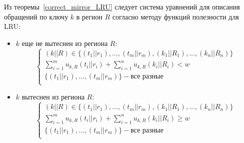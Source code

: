 \documentclass[14pt]{extreport}
\newcommand{\LRU}{\textsf{LRU}\xspace}
\begin{document}
Из теоремы~\ref{correct_mirror_LRU} следует система уравнений для
описания обращений по ключу $k$ в регион $R$ согласно методу функций полезности
для \LRU: \begin{itemize}
\item $k$ еще не вытеснен из региона $R$:
$$
\left\{\begin{array}{l} (k||R) \in \{(t_1||r_1), ..., (t_m||r_m), (k_1||R_1),
..., (k_n||R_n)\}\\
\sum\limits_{i=1}^m u_{k,R}(t_i||r_i) + \sum\limits_{i=1}^n u_{k,R}(k_i||R_i) <
w\\
\{(t_1||r_1), ..., (t_m||r_m)\} - \mbox{все разные}\\
\end{array} \right.
$$
\item $k$ вытеснен из региона $R$:
$$
\left\{\begin{array}{l} (k||R) \in \{(t_1||r_1), ..., (t_m||r_m), (k_1||R_1),
..., (k_n||R_n)\}\\
\sum\limits_{i=1}^m u_{k,R}(t_i||r_i) + \sum\limits_{i=1}^n u_{k,R}(k_i||R_i)
\geqslant w\\
\{(t_1||r_1), ..., (t_m||r_m)\} - \mbox{все разные}\\
\end{array} \right.
$$
\end{itemize}


%
%
%
%
\end{document}
